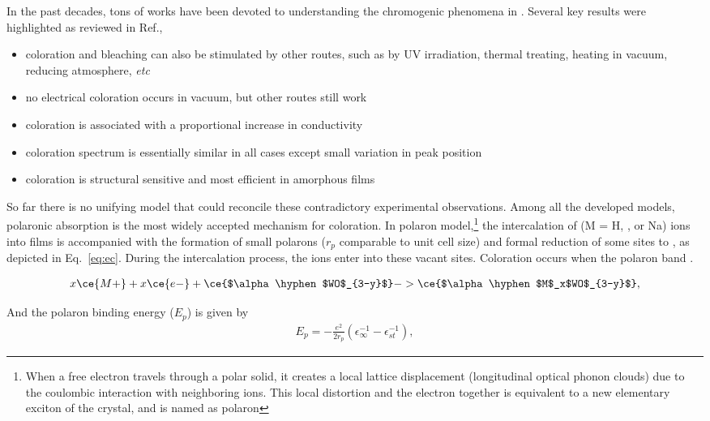 In the past decades, tons of works have been devoted to understanding the chromogenic phenomena in . Several key results were highlighted as reviewed in Ref.\cite{Deb2008},
\begin{itemize}
    \item coloration and bleaching can also be stimulated by other routes, such as by UV irradiation, thermal treating, heating in vacuum, reducing atmosphere, \emph{etc}
    \item no electrical coloration occurs in vacuum, but other routes still work
    \item coloration is associated with a proportional increase in conductivity
    \item coloration spectrum is essentially similar in all cases except small variation in peak position
    \item coloration is structural sensitive and most efficient in amorphous films
\end{itemize}

So far there is no unifying model that could reconcile these contradictory experimental observations. Among all the developed models, polaronic absorption is the most widely accepted mechanism for coloration. In polaron model,\footnote{When a free electron travels through a polar solid, it creates a local lattice displacement (longitudinal optical phonon clouds) due to the coulombic interaction with neighboring ions. This local distortion and the electron together is equivalent to a new elementary exciton of the crystal, and is named as polaron} the intercalation of  (M = H, , or Na) ions into  films is accompanied with the formation of small polarons ($r_p$ comparable to unit cell size) and formal reduction of some  sites to , as depicted in Eq.~\ref{eq:ec}. During the intercalation process, the  ions enter into these vacant sites.\cite{Hepel2008} Coloration occurs when the polaron band .

\begin{align}\label{eq:ec}
x\ce{M+} + x\ce{e-} +  \ce{$\alpha \hyphen$WO$_{3-y}$}-> \ce{$\alpha \hyphen$M$_x$WO$_{3-y}$},
\end{align}

And the polaron binding energy ($E_p$) is given by
\begin{align}
E_p = - \frac{e^2}{2r_p} (\epsilon_\infty^{-1} - \epsilon_{st}^{-1}),
\end{align}

